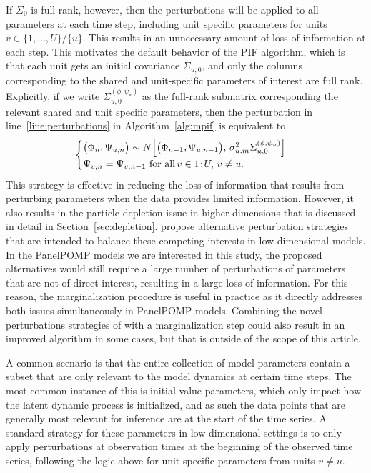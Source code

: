     If $\Sigma_0$ is full rank, however, then the perturbations will be applied to all parameters at each time step, including unit specific parameters for units $v \in \{1, \ldots, U\} / \{u\}$. 
    This results in an unnecessary amount of loss of information at each step.
    This motivates the default behavior of the PIF algorithm, which is that each unit gets an initial covariance $\Sigma_{u, 0}$, and only the columns corresponding to the shared and unit-specific parameters of interest are full rank. 
    Explicitly, if we write $\Sigma_{u, 0}^{(\phi, \psi_u)}$ as the full-rank submatrix corresponding the relevant shared and unit specific parameters, then the perturbation in line~\ref{line:perturbations} in Algorithm~\ref{alg:mpif} is equivalent to 
\begin{equation*}
  \begin{cases}
    \big(\Phi_{n}, \Psi_{u, n} \big) \sim N\Big[\big(\Phi_{n-1}, \Psi_{u, n-1} \big), \, 
        \sigma^2_{u, m}\Sigma_{u, 0}^{(\phi, \psi_u)}\Big]
    \\
    \Psi_{v, n} = \Psi_{v, n-1} \text{ for all} \, v \in {1}\!:\!{U}, \, v \neq u.
  \end{cases}  
\end{equation*}
 This strategy is effective in reducing the loss of information that results from perturbing parameters when the data provides limited information. 
 However, it also results in the particle depletion issue in higher dimensions that is discussed in detail in Section~\ref{sec:depletion}. 
 \citet{chen24} propose alternative perturbation strategies that are intended to balance these competing interests in low dimensional models. 
 In the PanelPOMP models we are interested in this study, the proposed alternatives would still require a large number of perturbations of parameters that are not of direct interest, resulting in a large loss of information. 
 For this reason, the marginalization procedure is useful in practice as it directly addresses both issues simultaneously in PanelPOMP models. 
 Combining the novel perturbations strategies of \citet{chen24} with a marginalization step could also result in an improved algorithm in some cases, but that is outside of the scope of this article. 
    
A common scenario is that the entire collection of model parameters contain a subset that are only relevant to the model dynamics at certain time steps. 
The most common instance of this is initial value parameters, which only impact how the latent dynamic process is initialized, and as such the data points that are generally most relevant for inference are at the start of the time series. 
A standard strategy for these parameters in low-dimensional settings is to only apply perturbations at observation times at the beginning of the observed time series, following the logic above for unit-specific parameters from units $v \neq u$. 
  
